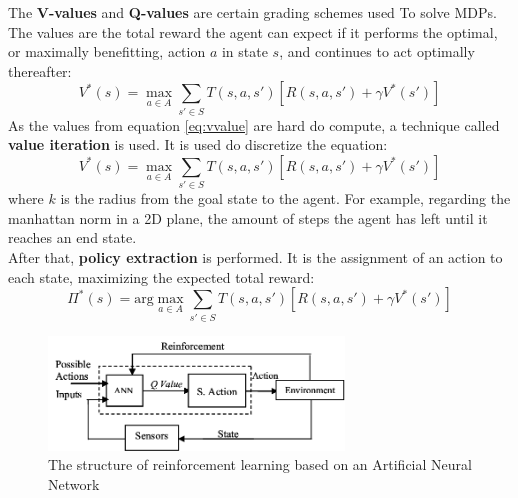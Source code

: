 \documentclass[a4paper]{article}
\begin{document}
	The \textbf{V-values} and \textbf{Q-values} are certain grading schemes used To solve MDPs. The values are the total reward the agent can expect if it performs the optimal, or maximally benefitting, action $a$ in state $s$, and continues to act optimally thereafter:
	\begin{equation}\label{eq:vvalue}
		V^*(s) = \max_{a \in A} \sum_{s' \in S}^{} T(s,a,s')[R(s,a,s')+\gamma V^*(s')]
	\end{equation}
	As the values from equation \ref{eq:vvalue} are hard do compute, a technique called \textbf{value iteration} is used. It is used do discretize the equation: 
	\begin{equation}\label{eq:value-iteration}
		V^*(s) = \max_{a \in A} \sum_{s' \in S}^{} T(s,a,s')[R(s,a,s')+\gamma V^*(s')]
	\end{equation}
	where $k$ is the radius from the goal state to the agent. For example, regarding the manhattan norm in a 2D plane, the amount of steps the agent has left until it reaches an end state.\\
	After that, \textbf{policy extraction} is performed. It is the assignment of an action to each state, maximizing the expected total reward:
	\begin{equation}
		\Pi^*(s) = \text{arg}\max_{a \in A} \sum_{s' \in S}^{} T(s,a,s')[R(s,a,s')+\gamma V^*(s')]
	\end{equation}
	\begin{figure}[t]
		\centering
		\includegraphics[angle=0,width=0.7\textwidth]{./figs/RL_ANN.png}
		\caption{\label{fig:qlearn}The structure of reinforcement learning based on an Artificial Neural Network \citep{HatemRL}}
	\end{figure}
\end{document}
